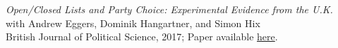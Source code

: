 \documentclass[centered]{res}
\begin{document}
\begin{resume}
{\sl Open/Closed Lists and Party Choice: Experimental Evidence from the U.K.}\\with Andrew Eggers, Dominik Hangartner, and Simon Hix \\
British Journal of Political Science, 2017; Paper available \href{http://journals.cambridge.org/action/displayFulltext?type=1&fid=10345643&jid=JPS&volumeId=-1&issueId=-1&aid=10345638} {here}.









\end{resume}
\end{document}
